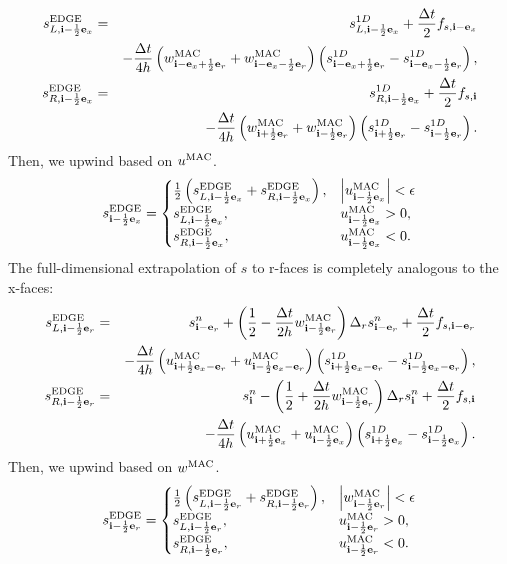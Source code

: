 \documentclass[11pt]{article}
\def\half  {\frac{1}{2}}
\def\dt    {\Delta t}
\def\edge  {\rm EDGE}
\def\mac   {\rm MAC}
\def\eb    {{\bf e}}
\def\ib    {{\bf i}}
\begin{document}
\begin{eqnarray}
s_{L,\ib-\half\eb_x}^{\edge} &=& s_{L,\ib-\half\eb_x}^{1D} + \frac{\dt}{2}f_{s,\ib-\eb_x} \nonumber \\
&& - \frac{\dt}{4h}\left(w_{\ib-\eb_x+\half\eb_r}^{\mac}+w_{\ib-\eb_x-\half\eb_r}^{\mac}\right)\left(s_{\ib-\eb_x+\half\eb_r}^{1D} - s_{\ib-\eb_x-\half\eb_r}^{1D}\right), \\
s_{R,\ib-\half\eb_x}^{\edge} &=& s_{R,\ib-\half\eb_x}^{1D} + \frac{\dt}{2}f_{s,\ib} \nonumber \\
&& - \frac{\dt}{4h}\left(w_{\ib+\half\eb_r}^{\mac}+w_{\ib-\half\eb_r}^{\mac}\right)\left(s_{\ib+\half\eb_r}^{1D} - s_{\ib-\half\eb_r}^{1D}\right).
\end{eqnarray}
Then, we upwind based on $u^{\mac}$.
\begin{equation}
s_{\ib-\half\eb_x}^{\edge} =
\begin{cases}
\half\left(s_{L,\ib-\half\eb_x}^{\edge} + s_{R,\ib-\half\eb_x}^{\edge}\right), & \left|u^{\mac}_{\ib-\half\eb_x}\right| < \epsilon \\
s_{L,\ib-\half\eb_x}^{\edge}, & u^{\mac}_{\ib-\half\eb_x} > 0, \\
s_{R,\ib-\half\eb_x}^{\edge}, & u^{\mac}_{\ib-\half\eb_x} < 0.
\end{cases}
\end{equation}
The full-dimensional extrapolation of $s$ to r-faces is completely analogous to the x-faces:
\begin{eqnarray}
s_{L,\ib-\half\eb_r}^{\edge} &=& s_{\ib-\eb_r}^n + \left(\half - \frac{\dt}{2h}w_{\ib-\half\eb_r}^{\mac}\right)\Delta_r s_{\ib-\eb_r}^n + \frac{\dt}{2}f_{s,\ib-\eb_r} \nonumber \\
&& - \frac{\dt}{4h}\left(u_{\ib+\half\eb_x-\eb_r}^{\mac}+u_{\ib-\half\eb_x-\eb_r}^{\mac}\right)\left(s_{\ib+\half\eb_x-\eb_r}^{1D} - s_{\ib-\half\eb_x-\eb_r}^{1D}\right),  \\
s_{R,\ib-\half\eb_r}^{\edge} &=& s_{\ib}^n - \left(\half + \frac{\dt}{2h}w_{\ib-\half\eb_r}^{\mac}\right)\Delta_r s_{\ib}^n + \frac{\dt}{2}f_{s,\ib} \nonumber \\
&& - \frac{\dt}{4h}\left(u_{\ib+\half\eb_x}^{\mac}+u_{\ib-\half\eb_x}^{\mac}\right)\left(s_{\ib+\half\eb_x}^{1D} - s_{\ib-\half\eb_x}^{1D}\right). 
\end{eqnarray}
Then, we upwind based on $w^{\mac}$.
\begin{equation}
s_{\ib-\half\eb_r}^{\edge} =
\begin{cases}
\half\left(s_{L,\ib-\half\eb_r}^{\edge} + s_{R,\ib-\half\eb_r}^{\edge}\right), & \left|w^{\mac}_{\ib-\half\eb_r}\right| < \epsilon \\
s_{L,\ib-\half\eb_r}^{\edge}, & u^{\mac}_{\ib-\half\eb_r} > 0, \\
s_{R,\ib-\half\eb_r}^{\edge}, & u^{\mac}_{\ib-\half\eb_r} < 0.
\end{cases}
\end{equation}
\cleardoublepage
\end{document}
